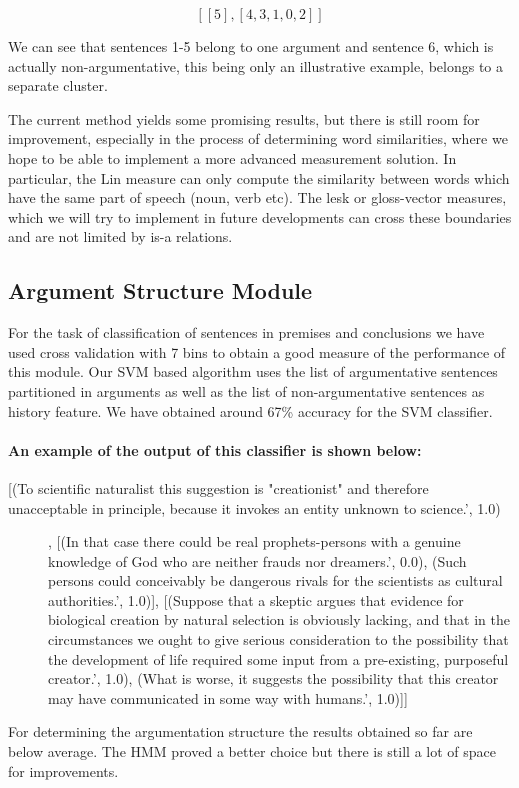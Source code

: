 \[ [[5], [4, 3, 1, 0, 2]] \]
\par
We can see that sentences 1-5 belong to one argument and sentence 6, which is actually non-argumentative, this being only an illustrative example, belongs to a separate cluster.
\par
The current method yields some promising results, but there is still room for improvement, especially in the process of determining word similarities, where we hope to be able to implement a more advanced measurement solution. In particular, the Lin measure can only compute the similarity between words which have the same part of speech (noun, verb etc). The lesk or gloss-vector measures, which we will try to implement in future developments can cross these boundaries and are not limited by is-a relations.

\subsection{Argument Structure Module}
\par
For the task of classification of sentences in premises and conclusions we have used cross validation with 7 bins to obtain a good measure of the performance of this module. Our SVM based algorithm uses the list of argumentative sentences partitioned in arguments as well as the list of non-argumentative sentences as history feature. We have obtained around 67\% accuracy for the SVM classifier.
\paragraph*{An example of the output of this classifier is shown below:}
\begin{description}
\item [[(To scientific naturalist this suggestion is "creationist" and therefore unacceptable in principle, because it invokes an entity unknown to science.', 1.0)], [(In that case there could be real prophets-persons with a genuine knowledge of God who are neither frauds nor dreamers.', 0.0), (Such persons could conceivably be dangerous rivals for the scientists as cultural authorities.', 1.0)], [(Suppose that a skeptic argues that evidence for biological creation by natural selection is obviously lacking, and that in the circumstances we ought to give serious consideration to the possibility that the development of life required some input from a pre-existing, purposeful creator.', 1.0), (What is worse, it suggests the possibility that this creator may have communicated in some way with humans.', 1.0)]]
\end{description}
\par
For determining the argumentation structure the results obtained so far are below average. The HMM proved a better choice but there is still a lot of space for improvements.
